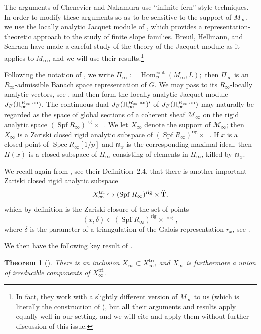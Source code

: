 \documentclass[JEP,XML,SOM,Unicode,NoEqCountersInSection]{cedram}
\let\mathcal\mathscr
\newcommand\hto{\mathrel{\lhook\joinrel\to}}
\newtheorem{thm}[prop]{Theorem}
\theoremstyle{definition}
\DeclareMathOperator{\Spf}{Spf}
\DeclareMathOperator{\That}{\widehat{T}}
\DeclareMathOperator{\Hom}{Hom}
\DeclareMathOperator{\Spec}{Spec}
\newcommand{\mm}{\mathfrak m}
\newcommand{\cM}{\mathcal{M}}
\newcommand{\cO}{\mathcal{O}}
\newcommand{\ana}{\mathrm{an}}
\newcommand{\cont}{\mathrm{cont}}
\newcommand\reg{\mathrm{reg}}
\newcommand\rig{\mathrm{rig}}
\newcommand\tri{\mathrm{tri}}
\begin{document}
The arguments of Chenevier and Nakamura use ``infinite fern''-style
techniques. In order to modify these arguments so as to be sensitive
to the support of $M_{\infty}$, we use the locally analytic Jacquet
module of \cite{Jacquet-one}, which provides a representation-theoretic
approach to the study of finite slope families. Breuil, Hellmann,
and Schraen \cite{BHS} have made a careful study of the theory
of the Jacquet module as it applies to $M_{\infty}$, and we will
use their results.\footnote{In fact, they work with a slightly
different version of $M_{\infty}$ to us (which is literally
the construction of \cite{six-authors}), but all their arguments
and results apply equally well in our setting, and we will cite
and apply them without further discussion of this issue.}

Following the notation of \cite{BHS},
we write $\Pi_{\infty} := \Hom^{\cont}_{\cO}
(M_{\infty}, L);$ then $\Pi_{\infty}$ is an
$R_{\infty}$-admissible Banach space representation of $G$.
We may pass to its $R_{\infty}$-locally analytic vectors, see \cite[\S 3.1]{BHS},
and then form the locally analytic Jacquet module
$J_B(\Pi_{\infty}^{R_{\infty}\textup{-}\ana})$.
The continuous dual
$J_B(\Pi_{\infty}^{R_{\infty}\textup{-}\ana})'$
of $J_B(\Pi_{\infty}^{R_{\infty}\textup{-}\ana})$
may naturally be
regarded as the space of global sections of a coherent sheaf
$\cM_{\infty}$
on the rigid analytic
space $(\Spf R_{\infty})^{\rig} \times \That$.
We let $X_{\infty}$ denote the support of $\cM_{\infty}$;
then $X_{\infty}$ is a
Zariski closed rigid analytic subspace of
$ (\Spf R_{\infty})^{\rig}\times \That$. If $x$ is a closed point of $\Spec R_{\infty}[1/p]$ and
$\mm_x$ is the corresponding maximal ideal,
then $\Pi(x)$ is a closed subspace of $\Pi_{\infty}$ consisting of elements in $\Pi_{\infty}$, killed
by $\mm_x$.

We recall again from \cite{BHS}, see their Definition~2.4,
that there is another important
Zariski closed rigid analytic subspace
\[
X^{\tri}_{\infty} \hto
(\Spf R_{\infty})^{\rig}\times \That,
\]
which by definition is the Zariski closure of the
set of points
\[
(x,\delta) \in
(\Spf R_{\infty})^{\rig}\times \That^{\reg},
\]
where $\delta$ is the parameter of a triangulation of the Galois
representation $r_x$, see \hbox{\cite[\S 2.2]{BHS}}.

We then have the following key result of \cite{BHS}.

\begin{thm}[{\cite[Th.\,3.21]{BHS}}]
\label{thm:BHS main}
There is an inclusion
$X_{\infty} \subset X^{\tri}_{\infty}$,
and $X_{\infty}$ is furthermore a union of irreducible
components of $X^{\tri}_{\infty}$.
\end{thm}
\end{document}
